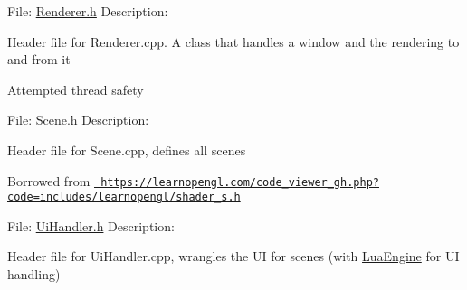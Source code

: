 File\+: \mbox{\hyperlink{_renderer_8h_source}{Renderer.\+h}} Description\+:

Header file for Renderer.\+cpp. A class that handles a window and the rendering to and from it

Attempted thread safety

File\+: \mbox{\hyperlink{_scene_8h_source}{Scene.\+h}} Description\+:

Header file for Scene.\+cpp, defines all scenes

Borrowed from \href{https://learnopengl.com/code_viewer_gh.php?code=includes/learnopengl/shader_s.h}{\texttt{ https\+://learnopengl.\+com/code\+\_\+viewer\+\_\+gh.\+php?code=includes/learnopengl/shader\+\_\+s.\+h}}

File\+: \mbox{\hyperlink{_ui_handler_8h_source}{Ui\+Handler.\+h}} Description\+:

Header file for Ui\+Handler.\+cpp, wrangles the UI for scenes (with \mbox{\hyperlink{classdarksun_1_1_lua_engine}{Lua\+Engine}} for UI handling) 
